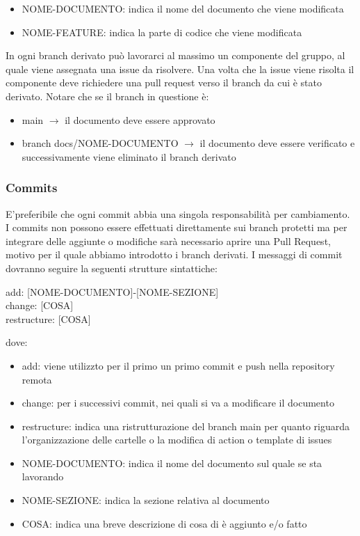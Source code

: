\begin{itemize}
            \begin{itemize}
                \item NOME-DOCUMENTO: indica il nome del documento che viene modificata
                \item NOME-FEATURE: indica la parte di codice che viene modificata
            \end{itemize}
        \end{itemize}

        In ogni branch derivato può lavorarci al massimo un componente del gruppo, al quale
        viene assegnata una issue da risolvere. Una volta che la issue viene risolta il componente deve richiedere una pull request
        verso il branch da cui è stato derivato.
        Notare che se il branch in questione è:
        \begin{itemize}
            \item main $\rightarrow$ il documento deve essere approvato
            \item branch docs/NOME-DOCUMENTO $\rightarrow$ il documento deve essere verificato e successivamente viene eliminato il branch derivato
        \end{itemize}

        \subsubsection{Commits}
        E'preferibile che ogni commit abbia una singola responsabilità per cambiamento.
        I commits non possono essere effettuati direttamente sui branch protetti ma per integrare delle aggiunte o
        modifiche sarà necessario aprire una Pull Request, motivo per il quale abbiamo introdotto i branch derivati.
        I messaggi di commit dovranno seguire la seguenti strutture sintattiche:
        \begin{center}
            add: [NOME-DOCUMENTO]-[NOME-SEZIONE]\\
            change: [COSA]\\
            restructure: [COSA]
        \end{center}
        dove: 
        \begin{itemize}
            \item add: viene utilizzto per il primo un primo commit e push nella repository remota
            \item change: per i successivi commit, nei quali si va a modificare il documento
            \item restructure: indica una ristrutturazione del branch main per quanto riguarda l'organizzazione delle cartelle o la modifica di action o template di issues
            \item NOME-DOCUMENTO: indica il nome del documento sul quale se sta lavorando
            \item NOME-SEZIONE: indica la sezione relativa al documento
            \item COSA: indica una breve descrizione di cosa di è aggiunto e/o fatto
        \end{itemize}

